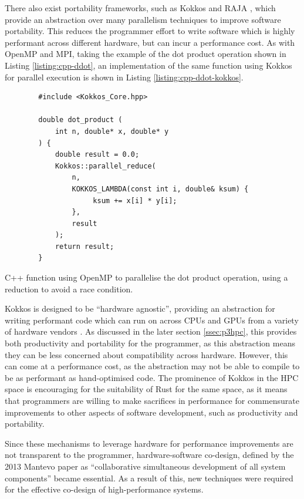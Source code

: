 There also exist portability frameworks, such as Kokkos \cite{edwardsKokkosEnablingPerformance2013} and RAJA \cite{RAJAPortabilitySuite}, which provide an abstraction over many parallelism techniques to improve software portability. This reduces the programmer effort to write software which is highly performant across different hardware, but can incur a performance cost. As with OpenMP and MPI, taking the example of the dot product operation shown in Listing \ref{listing:cpp-ddot}, an implementation of the same function using Kokkos for parallel execution is shown in Listing \ref{listing:cpp-ddot-kokkos}.

\begin{code}
    \begin{verbatim}
        #include <Kokkos_Core.hpp>
        
        double dot_product (
            int n, double* x, double* y
        ) {
            double result = 0.0;
            Kokkos::parallel_reduce(
                n,
                KOKKOS_LAMBDA(const int i, double& ksum) {
                     ksum += x[i] * y[i];
                },
                result
            );
            return result;
        }
    \end{verbatim}
    \caption{C++ function using OpenMP to parallelise the dot product operation, using a reduction to avoid a race condition.}
    \label{listing:cpp-ddot-kokkos}
\end{code}

Kokkos is designed to be ``hardware agnostic'', providing an abstraction for writing performant code which can run on across CPUs and GPUs from a variety of hardware vendors \cite{KokkosEcosystem}. As discussed in the later section \ref{ssec:p3hpc}, this provides both productivity and portability for the programmer, as this abstraction means they can be less concerned about compatibility across hardware. However, this can come at a performance cost, as the abstraction may not be able to compile to be as performant as hand-optimised code. The prominence of Kokkos in the \acrshort{HPC} space is encouraging for the suitability of Rust for the same space, as it means that programmers are willing to make sacrifices in performance for commensurate improvements to other aspects of software development, such as productivity and portability.

Since these mechanisms to leverage hardware for performance improvements are not transparent to the programmer, hardware-software co-design, defined by the 2013 Mantevo paper as ``collaborative simultaneous development of all system components'' \cite{heroux2013mantevo} became essential. As a result of this, new techniques were required for the effective co-design of high-performance systems.

